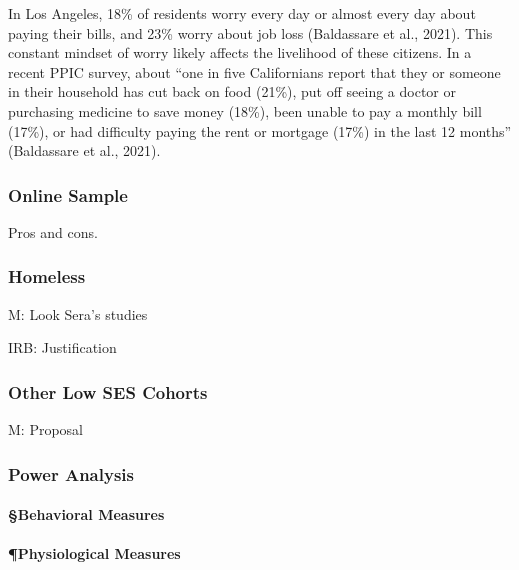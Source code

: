 \documentclass[
]{article}
\let\oldparagraph\paragraph
\renewcommand{\paragraph}[1]{\oldparagraph{#1}\mbox{}}
\begin{document}
In Los Angeles, 18\% of residents worry every day or almost every day
about paying their bills, and 23\% worry about job loss (Baldassare et
al., 2021). This constant mindset of worry likely affects the livelihood
of these citizens. In a recent PPIC survey, about ``one in five
Californians report that they or someone in their household has cut back
on food (21\%), put off seeing a doctor or purchasing medicine to save
money (18\%), been unable to pay a monthly bill (17\%), or had
difficulty paying the rent or mortgage (17\%) in the last 12 months''
(Baldassare et al., 2021).

\hypertarget{online-sample}{%
\subsubsection{Online Sample}\label{online-sample}}

Pros and cons.

\hypertarget{homeless}{%
\subsubsection{Homeless}\label{homeless}}

M: Look Sera's studies

IRB: Justification

\hypertarget{other-low-ses-cohorts}{%
\subsubsection{Other Low SES Cohorts}\label{other-low-ses-cohorts}}

M: Proposal

\hypertarget{power-analysis}{%
\subsubsection{Power Analysis}\label{power-analysis}}

\hypertarget{behavioral-measures}{%
\paragraph{§Behavioral Measures}\label{behavioral-measures}}

\hypertarget{physiological-measures}{%
\paragraph{¶Physiological Measures}\label{physiological-measures}}
\end{document}
